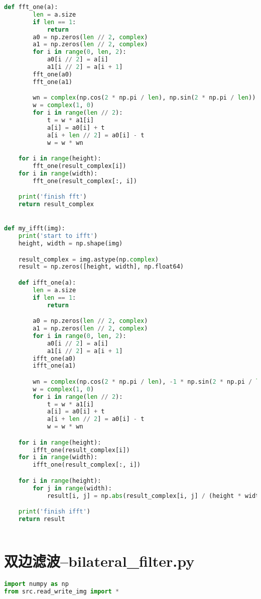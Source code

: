 \documentclass{hitreport}
\begin{document}
\begin{appendices}
\begin{lstlisting}[language=python]
    def fft_one(a):
        len = a.size
        if len == 1:
            return
        a0 = np.zeros(len // 2, complex)
        a1 = np.zeros(len // 2, complex)
        for i in range(0, len, 2):
            a0[i // 2] = a[i]
            a1[i // 2] = a[i + 1]
        fft_one(a0)
        fft_one(a1)

        wn = complex(np.cos(2 * np.pi / len), np.sin(2 * np.pi / len))
        w = complex(1, 0)
        for i in range(len // 2):
            t = w * a1[i]
            a[i] = a0[i] + t
            a[i + len // 2] = a0[i] - t
            w = w * wn

    for i in range(height):
        fft_one(result_complex[i])
    for i in range(width):
        fft_one(result_complex[:, i])

    print('finish fft')
    return result_complex


def my_ifft(img):
    print('start to ifft')
    height, width = np.shape(img)

    result_complex = img.astype(np.complex)
    result = np.zeros([height, width], np.float64)

    def ifft_one(a):
        len = a.size
        if len == 1:
            return

        a0 = np.zeros(len // 2, complex)
        a1 = np.zeros(len // 2, complex)
        for i in range(0, len, 2):
            a0[i // 2] = a[i]
            a1[i // 2] = a[i + 1]
        ifft_one(a0)
        ifft_one(a1)

        wn = complex(np.cos(2 * np.pi / len), -1 * np.sin(2 * np.pi / len))  # 参数
        w = complex(1, 0)
        for i in range(len // 2):
            t = w * a1[i]
            a[i] = a0[i] + t
            a[i + len // 2] = a0[i] - t
            w = w * wn

    for i in range(height):
        ifft_one(result_complex[i])
    for i in range(width):
        ifft_one(result_complex[:, i])

    for i in range(height):
        for j in range(width):
            result[i, j] = np.abs(result_complex[i, j] / (height * width))

    print('finish ifft')
    return result



\end{lstlisting}

\section{双边滤波--bilateral\_filter.py}
\begin{lstlisting}[language=python]
import numpy as np
from src.read_write_img import *



\end{lstlisting}
\end{appendices}
\end{document}

